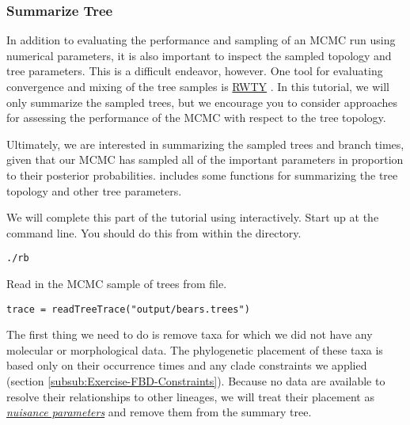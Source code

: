 \medskip
\subsubsection{Summarize Tree}\label{subsub:Exercise-SummarizeTree}


In addition to evaluating the performance and sampling of an MCMC run using numerical parameters, it is also important to inspect the sampled topology and tree parameters. 
This is a difficult endeavor, however. 
One tool for evaluating convergence and mixing of the tree samples is \href{https://github.com/danlwarren/RWTY}{RWTY} \citep{Warren2016}. 
In this tutorial, we will only summarize the sampled trees, but we encourage you to consider approaches for assessing the performance of the MCMC with respect to the tree topology.

Ultimately, we are interested in summarizing the sampled trees and branch times, given that our MCMC has sampled all of the important parameters in proportion to their posterior probabilities. 
\RevBayes includes some functions for summarizing the tree topology and other tree parameters.

We will complete this part of the tutorial using \RevBayes interactively.
Start up \RevBayes at the command line.
You should do this from within the  directory.
{\tt \begin{snugshade*}
\begin{lstlisting}
./rb
\end{lstlisting}
\end{snugshade*}}

Read in the MCMC sample of trees from file.
{\tt \begin{snugshade*}
\begin{lstlisting}
trace = readTreeTrace("output/bears.trees")
\end{lstlisting}
\end{snugshade*}}

The first thing we need to do is remove taxa for which we did not have any molecular or morphological data.
The phylogenetic placement of these taxa is based only on their occurrence times and any clade constraints we applied (section \ref{subsub:Exercise-FBD-Constraints}). 
Because no data are available to resolve their relationships to other lineages, we will treat their placement as \href{https://en.wikipedia.org/wiki/Nuisance_parameter}{\textit{nuisance parameters}} and remove them from the summary tree.

